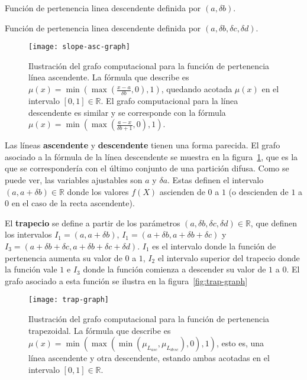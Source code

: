 \begin{marginfigure}
	\caption{Función de pertenencia linea descendente definida por $(a, \delta b)$.}
	\label{fig:line-desc}
\end{marginfigure}

\begin{marginfigure}
	\caption{Función de pertenencia linea descendente definida por $(a, \delta b, \delta c, \delta d)$.}
	\label{fig:trapz}
\end{marginfigure}

\begin{figure}
	\centering
	\texttt{[image: slope-asc-graph]}
	\caption[Grafo computacional de la función de pertenencia para la línea ascendente]{Ilustración del grafo computacional para la función de pertenencia línea ascendente. La fórmula que describe es $\mu(x) = \min(\max(\frac{x - a}{\delta b}, 0), 1)$, quedando acotada $\mu(x)$ en el intervalo $[0, 1] \in \mathbb{R}$. El grafo computacional para la línea descendente es similar y se corresponde con la fórmula $\mu(x) = \min(\max(\frac{a - x}{\delta b + 1}, 0), 1)$.}
	\label{fig:slope-asc-grap}
\end{figure}

Las líneas \textbf{ascendente} y \textbf{descendente} tienen una forma parecida. El grafo asociado a la fórmula de la línea descendente se muestra en la figura~\ref{fig:slope-asc-grap}, que es la que se correspondería con el último conjunto de una partición difusa. Como se puede ver, las variables ajustables son $a$ y $\delta a$. Estas definen el intervalo $(a, a + \delta b) \in \mathbb{R}$ donde los valores $f(X)$ ascienden de $0$ a $1$ (o descienden de $1$ a $0$ en el caso de la recta ascendente).

El \textbf{trapecio} se define a partir de los parámetros $(a, \delta b, \delta c, \delta d) \in \mathbb{R}$, que definen los intervalos $I_1 = (a, a + \delta b)$, $I_1 = (a + \delta b, a + \delta b + \delta c)$ y $I_3 = (a + \delta b + \delta c, a + \delta b + \delta c + \delta d)$. $I_1$ es el intervalo donde la función de pertenencia aumenta su valor de $0$ a $1$, $I_2$ el intervalo superior del trapecio donde la función vale $1$ e $I_3$ donde la función comienza a descender su valor de $1$ a $0$. El grafo asociado a esta función se ilustra en la figura~\ref{fig:trap-graph}

\begin{figure}
	\centering
	\texttt{[image: trap-graph]}
	\caption[Grafo computacional de la función de pertenencia para el trapecio]{Ilustración del grafo computacional para la función de pertenencia trapezoidal. La fórmula que describe es $\mu(x) = \min(\max(\min(\mu_{L_{asc}}, \mu_{L_{desc}}), 0), 1)$, esto es, una línea ascendente y otra descendente, estando ambas acotadas en el intervalo $[0, 1] \in \mathbb{R}$.}
	\label{fig:trap-grap}
\end{figure}

